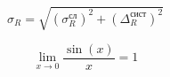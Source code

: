 \documentclass[a4paper,12pt]{article}
\begin{document}
 \begin{equation}
 \sigma_R = \sqrt{(\sigma^{\text{сл}}_R)^2+(\Delta^{\text{сист}}_R)^2}
 \end{equation}  
 
 \begin{equation}
 \lim_{x\to 0} \frac{\sin(x)}{x}=1
 \end{equation}  
\end{document}
